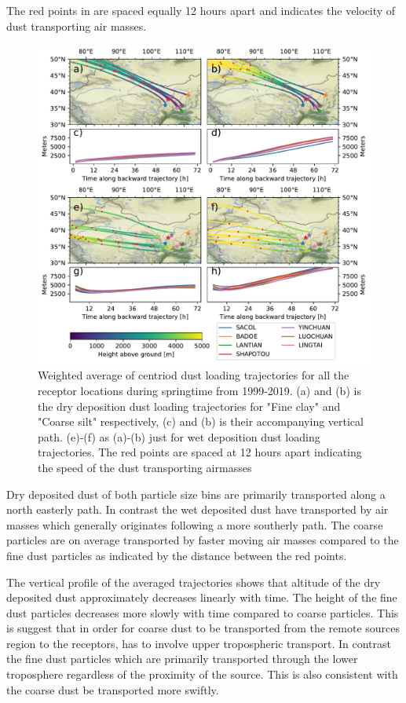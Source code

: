 \par The red points in  are spaced equally 12 hours apart and indicates the velocity of dust transporting air masses. 
\begin{figure}[hptb]
    \centering
    \includegraphics[width=\textwidth]{texfiles/figs/average_dust_transport_trajectories.pdf}
    \caption{Weighted average of centriod dust loading trajectories for all the receptor locations during springtime from 1999-2019. (a) and (b) is the dry deposition dust loading trajectories for "Fine clay" and "Coarse silt" respectively, (c) and (b) is their accompanying vertical path.  (e)-(f) as (a)-(b) just for wet deposition dust loading trajectories. The red points are spaced at 12 hours apart indicating the speed of the dust transporting airmasses }
    \label{fig:dust_loading_trajecs}
\end{figure}
Dry deposited dust of both particle size bins are primarily transported along a north easterly path. In contrast the wet deposited dust have transported by air masses which generally originates following a more southerly path. The coarse particles are on average transported by faster moving air masses compared to the fine dust particles as indicated by the distance between the red points.     

The vertical profile of the averaged trajectories shows that altitude of the dry deposited dust approximately decreases linearly with time. The height of the fine dust particles decreases more slowly with time compared to coarse particles. This is suggest that in order for coarse dust to be transported from the remote sources region to the receptors, has to involve upper tropospheric transport. In contrast the fine dust particles which are primarily transported through the lower troposphere regardless of the proximity of the source. This is also consistent with the coarse dust be transported more swiftly.  

